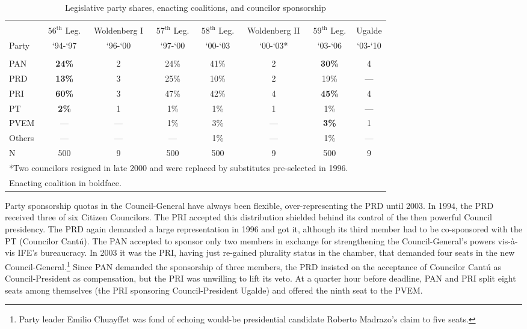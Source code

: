 \documentclass[12 pt, letter]{article}
\begin{document}
\begin{sidewaystable}
\caption{Legislative party shares, enacting coalitions, and
councilor sponsorship}\label{T:proposals}
\begin{center}
\begin{tabular}{lccccccc}
\hline\\ [-1.5ex]
      & $56^{\text{th}}$ Leg. & Woldenberg I & $57^{\text{th}}$ Leg. & $58^{\text{th}}$ Leg. & Woldenberg II & $59^{\text{th}}$ Leg. & Ugalde \\
Party &  `94-`97  &  `96-`00  &  `97-`00  &  `00-`03  &  `00-`03*  &  `03-`06  &  `03-`10 \\
\hline\\ [-1ex]
 PAN  & \textbf{24\%} & 2   & 24\% & 41\% & 2   & \textbf{30\%} & 4   \\
 PRD  & \textbf{13\%} & 3   & 25\% & 10\% & 2   & 19\%          & --- \\
 PRI  & \textbf{60\%} & 3   & 47\% & 42\% & 4   & \textbf{45\%} & 4   \\
 PT   & \textbf{ 2\%} & 1   &  1\% &  1\% & 1   & 1\%           & --- \\
 PVEM & ---           & --- &  1\% &  3\% & --- & \textbf{3\%}  & 1   \\
 Others & ---         & --- &  --- &  1\% & --- & 1\%           & --- \\
 N    & 500           & 9   &  500 &  500 & 9   & 500           & 9   \\
\hline
\multicolumn{7}{l}{\footnotesize{*Two councilors resigned in late 2000 and were replaced by substitutes pre-selected in 1996.}}\\
\multicolumn{7}{l}{\footnotesize{Enacting coalition in boldface.}}\\
\end{tabular}
\end{center}
\end{sidewaystable}

Party sponsorship quotas in the Council-General have always been flexible, over-representing the PRD until 2003.  In 1994, the PRD received three of six Citizen Councilors.  The PRI accepted this distribution shielded behind its control of the then powerful Council presidency.  The PRD again demanded a large representation in 1996 and got it, although its third member had to be co-sponsored with the PT (Councilor Cant\'u).  The PAN accepted to sponsor only two members in exchange for strengthening the Council-General's powers vis-\`{a}-vis IFE's bureaucracy.  In 2003 it was the PRI, having just re-gained plurality status in the chamber, that demanded four seats in the new Council-General.\footnote{Party leader Emilio Chuayffet was fond of echoing would-be presidential candidate Roberto Madrazo's claim to five seats.}  Since PAN demanded the sponsorship of three members, the PRD insisted on the acceptance of Councilor Cant\'u as Council-President as compensation, but the PRI was unwilling to lift its veto.  At a quarter hour before deadline, PAN and PRI split eight seats among themselves (the PRI sponsoring Council-President Ugalde) and offered the ninth seat to the PVEM.
\end{document}
